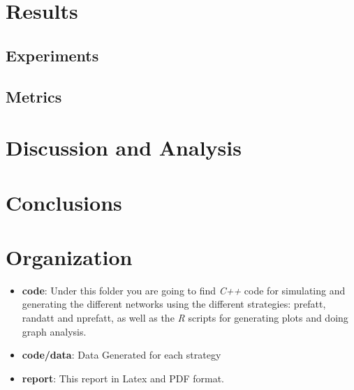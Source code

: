 \documentclass[12pt, a4paper]{article}
\begin{document}
\section{Results}
\subsection{Experiments}
\subsection{Metrics}

\section{Discussion and Analysis}
\section{Conclusions}




\appendix
\section{Organization}

\begin{itemize}
    \item \textbf{code}: Under this folder you are going to find \textit{C++} code for simulating and generating the different networks using the different strategies: \acrfull{prefatt}, \acrfull{randatt} and \acrfull{nprefatt}, as well as the \textit{R} scripts for generating plots and doing graph analysis.
    \item \textbf{code/data}: Data Generated for each strategy
    \item \textbf{report}: This report in Latex and PDF format.
\end{itemize}
\end{document}
